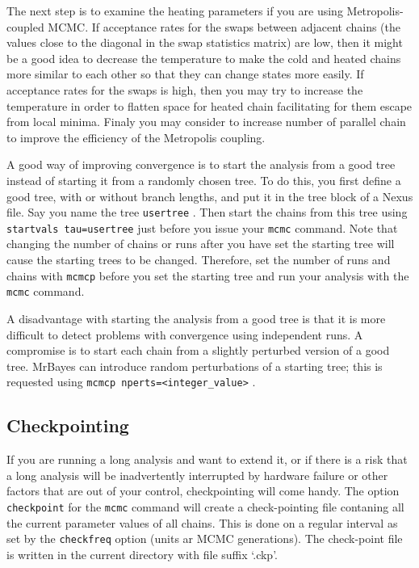 \documentclass[12pt]{book}
\newcommand{\ttt}[1]{\texttt{#1} }
\begin{document}
The next step is to examine the heating parameters if you are using Metropolis-coupled MCMC. If
acceptance rates for the swaps between adjacent chains (the values close to the diagonal in the
swap statistics matrix) are low, then it might be a good idea to decrease the temperature to make
the cold and heated chains more similar to each other so that they can change states more easily.
If acceptance rates for the swaps is high, then you may try to increase the temperature in order to
flatten space for heated chain facilitating for them escape from local minima. Finaly you may
consider to increase number of parallel chain to improve the efficiency of the Metropolis coupling.

A good way of improving convergence is to start the analysis from a good tree instead of starting
it from a randomly chosen tree. To do this, you first define a good tree, with or without branch
lengths, and put it in the tree block of a Nexus file. Say you name the tree \ttt{usertree}. Then
start the chains from this tree using \ttt{startvals tau=usertree} just before you issue your
\ttt{mcmc} command. Note that changing the number of chains or runs after you have set the starting
tree will cause the starting trees to be changed. Therefore, set the number of runs and chains with
\ttt{mcmcp} before you set the starting tree and run your analysis with the \ttt{mcmc} command.

A disadvantage with starting the analysis from a good tree is that it is more difficult to detect
problems with convergence using independent runs. A compromise is to start each chain from a
slightly perturbed version of a good tree. MrBayes can introduce random perturbations of a starting
tree; this is requested using \ttt{mcmcp nperts=<integer\_value>}.

\subsection{Checkpointing} 
\label{checkpointing}
If you are running a long analysis and want to extend it, or if there is a risk that a long 
analysis will be inadvertently interrupted by hardware failure or other factors that are out of
your control, checkpointing will come handy. The option \ttt{checkpoint} for the \ttt{mcmc} command
will create a check-pointing file contaning all the current parameter values of all chains.
This is done on a regular interval as set by the \ttt{checkfreq} option (units ar MCMC generations).
The check-point file is written in the current directory with file suffix `.ckp'.
\end{document}
